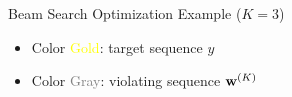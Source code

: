 \begin{frame}[fragile]{ Beam Search Optimization Example ($K=3$)}
\begin{center}
\begin{tikzpicture}[transform canvas = {scale=0.8}]
\end{tikzpicture}
  \end{center}  

  \air 
  \air 

  \begin{itemize}
  \item Color \textcolor{yellow}{Gold}: target sequence $y$
  \item Color \textcolor{gray}{Gray}: violating sequence $\wvec^{(K)}$
  \end{itemize}
\end{frame}

